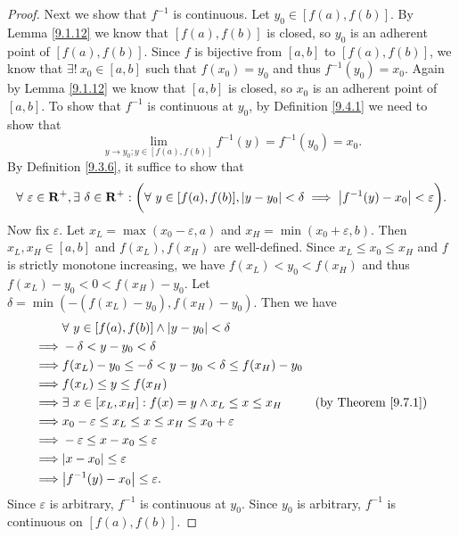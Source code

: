 \begin{proof}
    Next we show that \(f^{-1}\) is continuous.
    Let \(y_0 \in [f(a), f(b)]\).
    By Lemma \ref{9.1.12} we know that \([f(a), f(b)]\) is closed, so \(y_0\) is an adherent point of \([f(a), f(b)]\).
    Since \(f\) is bijective from \([a, b]\) to \([f(a), f(b)]\), we know that \(\exists!\ x_0 \in [a, b]\) such that \(f(x_0) = y_0\) and thus \(f^{-1}(y_0) = x_0\).
    Again by Lemma \ref{9.1.12} we know that \([a, b]\) is closed, so \(x_0\) is an adherent point of \([a, b]\).
    To show that \(f^{-1}\) is continuous at \(y_0\), by Definition \ref{9.4.1} we need to show that
    \[
        \lim_{y \to y_0 ; y \in [f(a), f(b)]} f^{-1}(y) = f^{-1}(y_0) = x_0.
    \]
    By Definition \ref{9.3.6}, it suffice to show that
    \[
        \forall\ \varepsilon \in \mathbf{R}^+, \exists\ \delta \in \mathbf{R}^+ : \bigg(\forall\ y \in [f(a), f(b)], \abs*{y - y_0} < \delta \implies \abs*{f^{-1}(y) - x_0} < \varepsilon\bigg).
    \]
    Now fix \(\varepsilon\).
    Let \(x_L = \max(x_0 - \varepsilon, a)\) and \(x_H = \min(x_0 + \varepsilon, b)\).
    Then \(x_L, x_H \in [a, b]\) and \(f(x_L), f(x_H)\) are well-defined.
    Since \(x_L \leq x_0 \leq x_H\) and \(f\) is strictly monotone increasing, we have \(f(x_L) < y_0 < f(x_H)\) and thus \(f(x_L) - y_0 < 0 < f(x_H) - y_0\).
    Let \(\delta = \min(-(f(x_L) - y_0), f(x_H) - y_0)\).
    Then we have
    \begin{align*}
        & \forall\ y \in [f(a), f(b)] \land \abs*{y - y_0} < \delta \\
        \implies & -\delta < y - y_0 < \delta \\
        \implies & f(x_L) - y_0 \leq -\delta < y - y_0 < \delta \leq f(x_H) - y_0 \\
        \implies & f(x_L) \leq y \leq f(x_H) \\
        \implies & \exists\ x \in [x_L, x_H] : f(x) = y \land x_L \leq x \leq x_H & \text{(by Theorem \ref{9.7.1})} \\
        \implies & x_0 - \varepsilon \leq x_L \leq x \leq x_H \leq x_0 + \varepsilon \\
        \implies & -\varepsilon \leq x - x_0 \leq \varepsilon \\
        \implies & \abs*{x - x_0} \leq \varepsilon \\
        \implies & \abs*{f^{-1}(y) - x_0} \leq \varepsilon.
    \end{align*}
    Since \(\varepsilon\) is arbitrary, \(f^{-1}\) is continuous at \(y_0\).
    Since \(y_0\) is arbitrary, \(f^{-1}\) is continuous on \([f(a), f(b)]\).


\end{proof}

